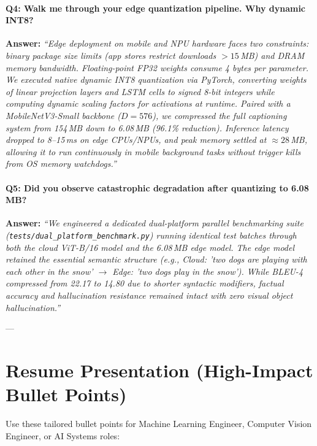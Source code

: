 \documentclass[11pt,a4paper]{article}
\begin{document}
\paragraph{Q4: Walk me through your edge quantization pipeline. Why dynamic INT8?}
\textbf{Answer:} 
\textit{``Edge deployment on mobile and NPU hardware faces two constraints: binary package size limits (app stores restrict downloads $> 15$\,MB) and DRAM memory bandwidth. Floating-point FP32 weights consume 4 bytes per parameter. We executed native dynamic INT8 quantization via PyTorch, converting weights of linear projection layers and LSTM cells to signed 8-bit integers while computing dynamic scaling factors for activations at runtime. Paired with a MobileNetV3-Small backbone ($D=576$), we compressed the full captioning system from 154\,MB down to 6.08\,MB (96.1\% reduction). Inference latency dropped to 8--15\,ms on edge CPUs/NPUs, and peak memory settled at $\approx 28$\,MB, allowing it to run continuously in mobile background tasks without trigger kills from OS memory watchdogs.''}

\paragraph{Q5: Did you observe catastrophic degradation after quantizing to 6.08\,MB?}
\textbf{Answer:} 
\textit{``We engineered a dedicated dual-platform parallel benchmarking suite (\texttt{tests/dual\_platform\_benchmark.py}) running identical test batches through both the cloud ViT-B/16 model and the 6.08\,MB edge model. The edge model retained the essential semantic structure (e.g., Cloud: 'two dogs are playing with each other in the snow' $\to$ Edge: 'two dogs play in the snow'). While BLEU-4 compressed from 22.17 to 14.80 due to shorter syntactic modifiers, factual accuracy and hallucination resistance remained intact with zero visual object hallucination.''}

---

\section{Resume Presentation (High-Impact Bullet Points)}

Use these tailored bullet points for Machine Learning Engineer, Computer Vision Engineer, or AI Systems roles:
\end{document}

